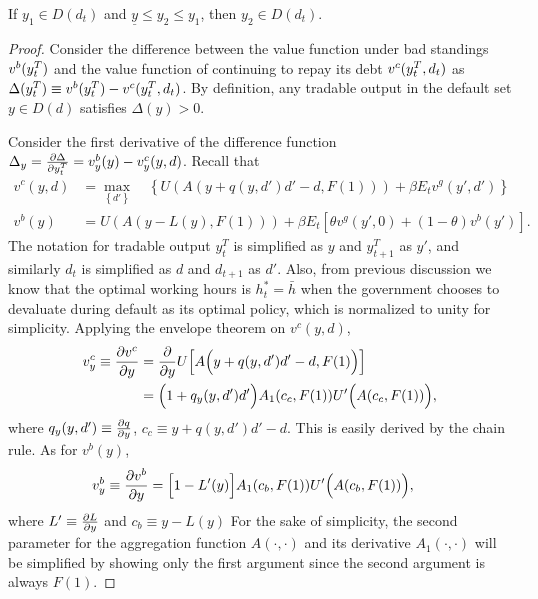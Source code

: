\begin{proposition}
    \label{prop2}
    If $y_1 \in D(d_t)$ and $\underline{y}\le y_2 \le y_1$, then $y_2 \in D(d_t)$.
\end{proposition}
\begin{proof}
    Consider the difference between the value function under bad standings $v^b(y^T_{t})$ and the value function of continuing to repay its debt  $v^c(y^T_{t}, d_t)$ as $\Delta(y^T_{t}) \equiv v^b(y^T_{t}) - v^c(y^T_{t}, d_t)$. By definition, any tradable output in the default set $y \in D(d)$ satisfies $\Delta(y) >0$.

    Consider the first derivative of the difference function $\Delta_{y} = \pdv{\Delta}{y^T_t} = v^b_{y}(y) - v^c_{y}(y, d)$.
    Recall that
    \begin{align*}
        v^c(y, d) &= \max_{\left\{d' \right\}} \quad
        \left\{
            U\left(
                A\left( y + q(y, d')d' - d, F(1)\right)
             \right)
             + \beta E_t
             v^g \left(
                y', d'
              \right)
         \right\}\\
        v^b(y) &=
            U\left(
                A\left( y - L(y), F(1)\right)
             \right)
             + \beta E_t \left[
                \theta v^g \left(
                    y', 0
                \right)
                + (1-\theta) v^b \left(
                    y'
                 \right)
            \right].
    \end{align*}
    The notation for tradable output $y^T_t$ is simplified as $y$ and $y^T_{t+1}$ as $y'$, and similarly $d_t$ is simplified as $d$ and $d_{t+1}$ as $d'$. Also, from previous discussion we know that the optimal working hours is $h^*_t = \bar{h}$ when the government chooses to devaluate during default as its optimal policy, which is normalized to unity for simplicity. Applying the envelope theorem on $v^c(y, d)$,
    \begin{align*}
        v^c_y \equiv \pdv{v^c}{y} &= \pdv{}{y} U\Big[ A\Big(y + q(y, d')d' - d, F(1)\Big)\Big]\\
        &=\Big(1 + q_y(y, d')d'\Big) A_1(c_c, F(1)) U'\Big(A(c_c, F(1))\Big),
    \end{align*}
    where $q_y(y, d') \equiv \pdv{q}{y}$, $c_c \equiv y + q(y, d')d' -d$. This is easily derived by the chain rule. As for $v^b(y)$,
    \begin{align*}
        v^b_y \equiv \pdv{v^b}{y} &=
        \Big[ 1 - L' (y)\Big] A_1 (c_b, F(1)) U' \Bigl(A(c_b, F(1))\Bigr),
    \end{align*}
    where $L' \equiv \pdv{L}{y}$ and $c_b \equiv y - L(y)$
    For the sake of simplicity, the second parameter for the aggregation function $A(\cdot, \cdot)$ and its derivative $A_1(\cdot,\cdot )$ will be simplified by showing only the first argument since the second argument is always $F(1)$.


\end{proof}
